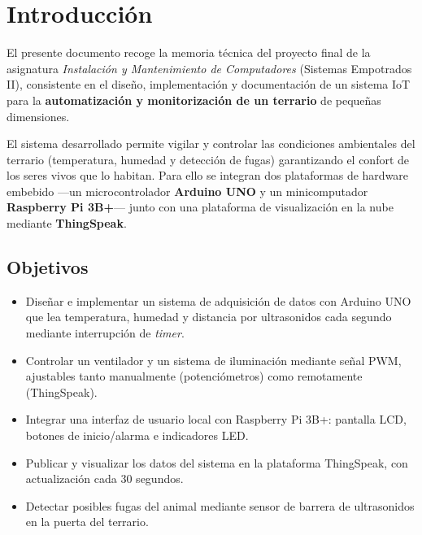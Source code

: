 \documentclass[12pt, a4paper]{article}
\begin{document}
\section{Introducción}

El presente documento recoge la memoria técnica del proyecto final de la asignatura
\textit{Instalación y Mantenimiento de Computadores} (Sistemas Empotrados II), consistente
en el diseño, implementación y documentación de un sistema IoT para la \textbf{automatización
y monitorización de un terrario} de pequeñas dimensiones.

El sistema desarrollado permite vigilar y controlar las condiciones ambientales del
terrario (temperatura, humedad y detección de fugas) garantizando el confort de los
seres vivos que lo habitan. Para ello se integran dos plataformas de hardware embebido
---un microcontrolador \textbf{Arduino UNO} y un minicomputador \textbf{Raspberry Pi 3B+}---
junto con una plataforma de visualización en la nube mediante \textbf{ThingSpeak}.

\subsection{Objetivos}

\begin{itemize}[noitemsep]
    \item Diseñar e implementar un sistema de adquisición de datos con Arduino UNO que
          lea temperatura, humedad y distancia por ultrasonidos cada segundo mediante
          interrupción de \textit{timer}.
    \item Controlar un ventilador y un sistema de iluminación mediante señal PWM,
          ajustables tanto manualmente (potenciómetros) como remotamente (ThingSpeak).
    \item Integrar una interfaz de usuario local con Raspberry Pi 3B+: pantalla LCD,
          botones de inicio/alarma e indicadores LED.
    \item Publicar y visualizar los datos del sistema en la plataforma ThingSpeak,
          con actualización cada 30 segundos.
    \item Detectar posibles fugas del animal mediante sensor de barrera de ultrasonidos
          en la puerta del terrario.
\end{itemize}
\end{document}
